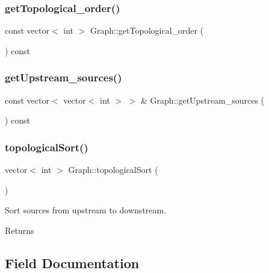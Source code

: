 \subsubsection{\texorpdfstring{get\+Topological\+\_\+order()}{getTopological\_order()}}
{\footnotesize\ttfamily const vector$<$ int $>$ Graph\+::get\+Topological\+\_\+order (\begin{DoxyParamCaption}{ }\end{DoxyParamCaption}) const}

\mbox{\label{classGraph_a0d4d0149e7d70bb9e6b7a5cae22062a3_a0d4d0149e7d70bb9e6b7a5cae22062a3}} 
\subsubsection{\texorpdfstring{get\+Upstream\+\_\+sources()}{getUpstream\_sources()}}
{\footnotesize\ttfamily const vector$<$ vector$<$ int $>$ $>$ \& Graph\+::get\+Upstream\+\_\+sources (\begin{DoxyParamCaption}{ }\end{DoxyParamCaption}) const}

\mbox{\label{classGraph_a8f154c485f989828d6fb515a28190ac2_a8f154c485f989828d6fb515a28190ac2}} 
\subsubsection{\texorpdfstring{topological\+Sort()}{topologicalSort()}}
{\footnotesize\ttfamily vector$<$ int $>$ Graph\+::topological\+Sort (\begin{DoxyParamCaption}{ }\end{DoxyParamCaption})\hspace{0.3cm}{\ttfamily [protected]}}

Sort sources from upstream to downstream. \begin{DoxyReturn}{Returns}

\end{DoxyReturn}


\subsection{Field Documentation}
\mbox{\label{classGraph_a04ab9c17ad31aa036def8db0f88b035b_a04ab9c17ad31aa036def8db0f88b035b}} 
